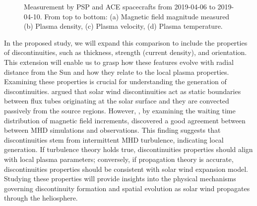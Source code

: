 \documentclass[
  letterpaper,
  DIV=11,
  numbers=noendperiod]{scrartcl}
\begin{document}
\begin{figure}


\caption{\label{fig-alignment}Measurement by PSP and ACE spacecrafts from 2019-04-06 to 2019-04-10. From top to bottom: (a) Magnetic field magnitude measured (b) Plasma density, (c) Plasma velocity, (d) Plasma temperature.}

\end{figure}%

In the proposed study, we will expand this comparison to include the properties of discontinuities, such as thickness, strength (current density), and orientation. This extension will enable us to grasp how these features evolve with radial distance from the Sun and how they relate to the local plasma properties. Examining these properties is crucial for understanding the generation of discontinuities.
\citet{borovskyFluxTubeTexture2008} argued that solar wind discontinuities act as static boundaries between flux tubes originating at the solar surface and they are convected passively from the source regions. However, \citet{grecoStatisticalAnalysisDiscontinuities2009}, by examining the waiting time distribution of magnetic ﬁeld increments, discovered a good agreement between between MHD simulations and observations. This finding suggests that discontinuities stem from intermittent MHD turbulence, indicating local generation.
If turbulence theory holds true, discontinuities properties should align with local plasma parameters; conversely, if propagation theory is accurate, discontinuities properties should be consistent with solar wind expansion model. Studying these properties will provide insights into the physical mechanisms governing discontinuity formation and spatial evolution as solar wind propagates through the heliosphere.
\end{document}
